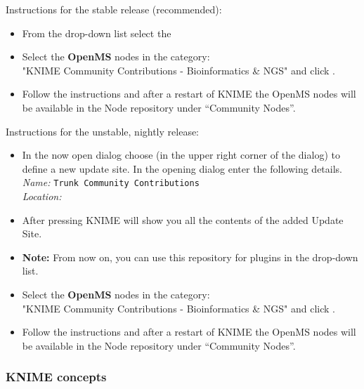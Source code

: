 {
Instructions for the stable release (recommended):
\begin{itemize}
  \item From the  drop-down list select the \\ \menu{\KnimeTrustedSite}
  \item Select the \textbf{OpenMS} nodes in the category: \\ "KNIME Community Contributions - Bioinformatics \& NGS" and click .
  \item Follow the instructions and after a restart of KNIME the OpenMS nodes will be available in the Node repository under “Community Nodes”.
\end{itemize}

Instructions for the unstable, nightly release:
\begin{itemize}
  \item \label{it:add_site} In the now open dialog choose  (in the upper right corner of the dialog) to define a new update site. In the opening dialog enter the following details. \\
  \textit{Name:} \texttt{Trunk Community Contributions} \\
  \textit{Location:} 
\end{itemize}  
  \menu{\KnimeTrunkSite}
\begin{itemize}
  \item \label{it:select_site} After pressing  KNIME will show you all the contents of the added Update Site.
  \item \textbf{Note:} From now on, you can use this repository for plugins in the  drop-down list.
  \item Select the \textbf{OpenMS} nodes in the category: \\ "KNIME Community Contributions - Bioinformatics \& NGS" and click .
  \item Follow the instructions and after a restart of KNIME the OpenMS nodes will be available in the Node repository under “Community Nodes”.
\end{itemize}
}

\subsubsection{KNIME concepts}
\label{KNIME_concepts}

